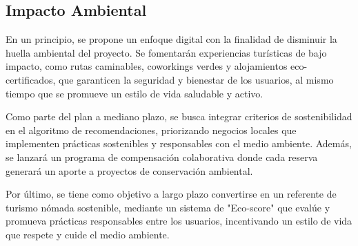\subsection{Impacto Ambiental}
En un principio, se propone un enfoque digital con la finalidad de disminuir la huella ambiental del proyecto. Se fomentarán experiencias turísticas de bajo impacto, como rutas caminables, coworkings verdes y alojamientos eco-certificados, que garanticen la seguridad y bienestar de los usuarios, al mismo tiempo que se promueve un estilo de vida saludable y activo.

Como parte del plan a mediano plazo, se busca integrar criterios de sostenibilidad en el algoritmo de recomendaciones, priorizando negocios locales que implementen prácticas sostenibles y responsables con el medio ambiente. Además, se lanzará un programa de compensación colaborativa donde cada reserva generará un aporte a proyectos de conservación ambiental.

Por último, se tiene como objetivo a largo plazo convertirse en un referente de turismo nómada sostenible, mediante un sistema de "Eco-score" que evalúe y promueva prácticas responsables entre los usuarios, incentivando un estilo de vida que respete y cuide el medio ambiente.
